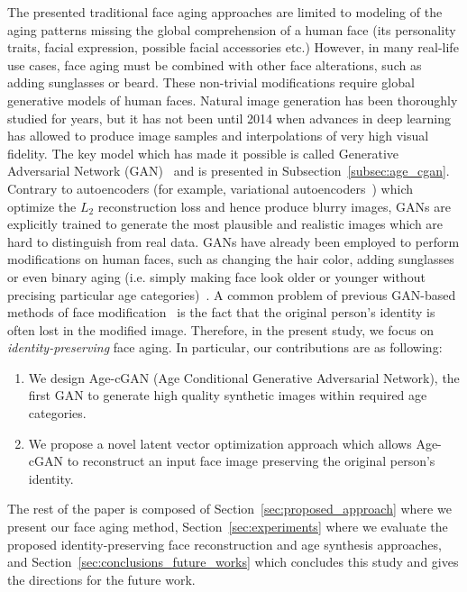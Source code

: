 \documentclass{article}
\begin{document}
The presented traditional face aging approaches are limited to modeling of the aging patterns missing the global comprehension of a human face (its personality traits, facial expression, possible facial accessories etc.)
However, in many real-life use cases, face aging must be combined with other face alterations, such as adding sunglasses or beard.
These non-trivial modifications require global generative models of human faces.
Natural image generation has been thoroughly studied for years, but it has not been until 2014 when advances in deep learning has allowed to produce image samples and interpolations of very high visual fidelity.
The key model which has made it possible is called Generative Adversarial Network (GAN)~\cite{goodfellow2014generative} and is presented in Subsection~\ref{subsec:age_cgan}.
Contrary to autoencoders (for example, variational autoencoders~\cite{kingma2014auto}) which optimize the $L_{2}$ reconstruction loss and hence produce blurry images, GANs are explicitly trained to generate the most plausible and realistic images which are hard to distinguish from real data.
GANs have already been employed to perform modifications on human faces, such as changing the hair color, adding sunglasses or even binary aging (i.e. simply making face look older or younger without precising particular age categories)~\cite{larsen2016autoencoding,perarnau2016invertible}.
A common problem of previous GAN-based methods of face modification~\cite{larsen2016autoencoding,perarnau2016invertible} is the fact that the original person's identity is often lost in the modified image.
Therefore, in the present study, we focus on \textit{identity-preserving} face aging.
In particular, our contributions are as following:
\begin{enumerate}
	\item We design Age-cGAN (Age Conditional Generative Adversarial Network), the first GAN to generate high quality synthetic images within required age categories.
	\item We propose a novel latent vector optimization approach which allows Age-cGAN to reconstruct an input face image preserving the original person's identity.
\end{enumerate}

The rest of the paper is composed of Section~\ref{sec:proposed_approach} where we present our face aging method, Section~\ref{sec:experiments} where we evaluate the proposed identity-preserving face reconstruction and age synthesis approaches, and Section~\ref{sec:conclusions_future_works} which concludes this study and gives the directions for the future work.
\end{document}
